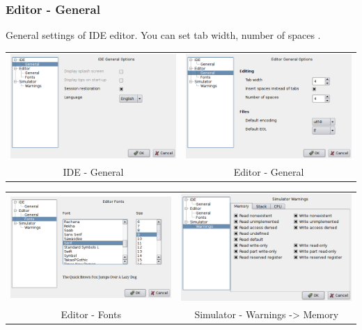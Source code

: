     \subsubsection{Editor - General}
        General settings of IDE editor. You can set tab width, number of spaces .

        \begin{table}[h!]
            \begin{tabular}{cc}
                \includegraphics[width=.5\textwidth]{img/NewImg/interface1.png}
                    &
                \includegraphics[width=.5\textwidth]{img/NewImg/interface2.png}
                    \\
                IDE - General & Editor - General
            \end{tabular}
        \end{table}

        \begin{table}[h!]
            \begin{tabular}{cc}
                \includegraphics[width=.5\textwidth]{img/NewImg/interface3.png}
                    &
                \includegraphics[width=.5\textwidth]{img/NewImg/interface4.png}
                    \\
                Editor - Fonts & Simulator - Warnings -> Memory
            \end{tabular}
        \end{table}

